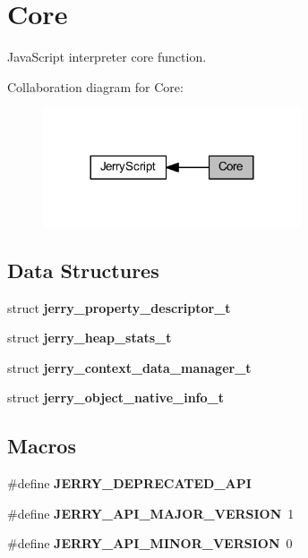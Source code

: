 \section{Core}
\label{group___core}


Java\+Script interpreter core function.  


Collaboration diagram for Core\+:
\nopagebreak
\begin{figure}[H]
\begin{center}
\leavevmode
\includegraphics[width=216pt]{group___core}
\end{center}
\end{figure}
\subsection*{Data Structures}
\begin{DoxyCompactItemize}
\item 
struct \textbf{ jerry\+\_\+property\+\_\+descriptor\+\_\+t}
\item 
struct \textbf{ jerry\+\_\+heap\+\_\+stats\+\_\+t}
\item 
struct \textbf{ jerry\+\_\+context\+\_\+data\+\_\+manager\+\_\+t}
\item 
struct \textbf{ jerry\+\_\+object\+\_\+native\+\_\+info\+\_\+t}
\end{DoxyCompactItemize}
\subsection*{Macros}
\begin{DoxyCompactItemize}
\item 
\#define \textbf{ J\+E\+R\+R\+Y\+\_\+\+D\+E\+P\+R\+E\+C\+A\+T\+E\+D\+\_\+\+A\+PI}
\item 
\#define \textbf{ J\+E\+R\+R\+Y\+\_\+\+A\+P\+I\+\_\+\+M\+A\+J\+O\+R\+\_\+\+V\+E\+R\+S\+I\+ON}~1
\item 
\#define \textbf{ J\+E\+R\+R\+Y\+\_\+\+A\+P\+I\+\_\+\+M\+I\+N\+O\+R\+\_\+\+V\+E\+R\+S\+I\+ON}~0
\end{DoxyCompactItemize}
